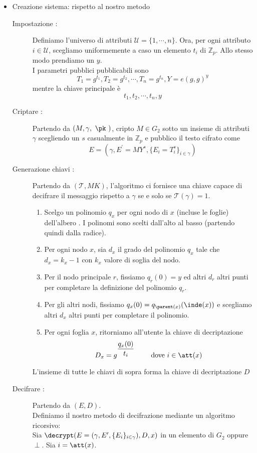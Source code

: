 \begin{itemize}
\item Creazione sistema: rispetto al nostro metodo
\begin{description}
\item[Impostazione :]Definiamo l'universo di attributi $\mathcal{U} = \{1,\cdots,n\}$. Ora, per ogni attributo $i \in \mathcal{U}$, scegliamo uniformemente a caso un elemento $t_i$ di $\mathbb{Z}_p$. Allo stesso modo prendiamo un $y$.\\
I parametri pubblici \pk pubblicabili sono
\[ T_1 = g^{t_1} , T_2 = g^{t_2} , \cdots , T_n = g^{t_n} , Y = e(g,g)^y \]
mentre la chiave principale è
\[ t_1 , t_2 , \cdots , t_n , y \]
\item[Criptare :] Partendo da $(M , \gamma, \text{ \pk })$, cripto $M \in G_2$ sotto un insieme di attributi $\gamma$ scegliendo un $s$ casualmente in $\mathbb{Z}_p$ e pubblico il testo cifrato come
\[ E = (\gamma , E^\prime = MY^s , \{E_i = T_i^s \}_{i\in\gamma}) \]
\item[Generazione chiavi :] Partendo da $( \mathcal{T} , MK )$, l'algoritmo ci fornisce una chiave capace di decifrare il messaggio rispetto a $\gamma$ se e solo se $\mathcal{T}(\gamma) = 1$.
\begin{enumerate}
\item Scelgo un polinomio $q_x$ per ogni nodo di $x$ (incluse le foglie) dell'albero . I polinomi sono scelti dall'alto al basso (partendo quindi dalla radice).
\item Per ogni nodo $x$, sia $d_x$ il grado del polinomio $q_x$ tale che $d_x = k_x - 1$ con $k_x$ valore di soglia del nodo.
\item Per il nodo principale $r$, fissiamo $q_r(0) = y$ ed altri $d_r$ altri punti per completare la definizione del polinomio $q_r$.
\item Per gli altri nodi, fissiamo $q_x(0) = q_{\parent(x)}(\inde(x))$ e scegliamo altri $d_x$ altri punti per completare il polinomio.
\item Per ogni foglia $x$, ritorniamo all'utente la chiave di decriptazione
\[ D_x = g^{\dfrac{q_x(0)}{t_i}} \qquad \text{ dove } i \in \att(x) \]
\end{enumerate}
L'insieme di tutte le chiavi di sopra forma la chiave di decriptazione $D$
\item[Decifrare :] Partendo da $(E,D)$.\\
Definiamo il nostro metodo di decifrazione mediante un algoritmo ricorsivo:\\
Sia $\decrypt( E = (\gamma,E^\prime,\{E_i\}_{i\in \gamma}), D , x )$ in un elemento di $G_2$ oppure $\perp$. Sia $i = \att(x)$.

\end{description}
\end{itemize}
